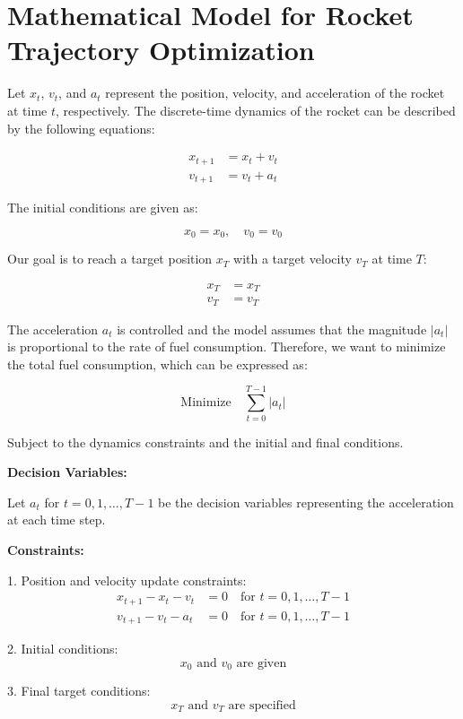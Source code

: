 \documentclass{article}
\begin{document}
\section*{Mathematical Model for Rocket Trajectory Optimization}

Let \( x_t \), \( v_t \), and \( a_t \) represent the position, velocity, and acceleration of the rocket at time \( t \), respectively. The discrete-time dynamics of the rocket can be described by the following equations:

\begin{align}
x_{t+1} &= x_t + v_t \\
v_{t+1} &= v_t + a_t
\end{align}

The initial conditions are given as:

\[
x_0 = x_0, \quad v_0 = v_0
\]

Our goal is to reach a target position \( x_T \) with a target velocity \( v_T \) at time \( T \):

\begin{align}
x_T &= x_T \\
v_T &= v_T
\end{align}

The acceleration \( a_t \) is controlled and the model assumes that the magnitude \( |a_t| \) is proportional to the rate of fuel consumption. Therefore, we want to minimize the total fuel consumption, which can be expressed as:

\[
\text{Minimize} \quad \sum_{t=0}^{T-1} |a_t|
\]

Subject to the dynamics constraints and the initial and final conditions. 

\textbf{Decision Variables:}

Let \( a_t \) for \( t = 0, 1, \ldots, T-1 \) be the decision variables representing the acceleration at each time step.

\textbf{Constraints:}

1. Position and velocity update constraints:
   \[
   \begin{align}
   x_{t+1} - x_t - v_t &= 0 \quad \text{for } t = 0, 1, \ldots, T-1 \\
   v_{t+1} - v_t - a_t &= 0 \quad \text{for } t = 0, 1, \ldots, T-1
   \end{align}
   \]

2. Initial conditions:
   \[
   x_0 \text{ and } v_0 \text{ are given}
   \]

3. Final target conditions:
   \[
   x_T \text{ and } v_T \text{ are specified}
   \]
\end{document}
